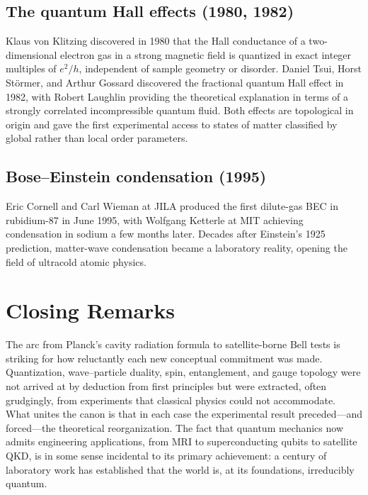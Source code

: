 \documentclass[11pt]{article}
\begin{document}
\subsection{The quantum Hall effects (1980, 1982)}
Klaus von Klitzing discovered in 1980 that the Hall conductance of a two-dimensional electron gas in a strong magnetic field is quantized in exact integer multiples of $e^2/h$, independent of sample geometry or disorder. Daniel Tsui, Horst St\"ormer, and Arthur Gossard discovered the fractional quantum Hall effect in 1982, with Robert Laughlin providing the theoretical explanation in terms of a strongly correlated incompressible quantum fluid. Both effects are topological in origin and gave the first experimental access to states of matter classified by global rather than local order parameters.

\subsection{Bose--Einstein condensation (1995)}
Eric Cornell and Carl Wieman at JILA produced the first dilute-gas BEC in rubidium-87 in June 1995, with Wolfgang Ketterle at MIT achieving condensation in sodium a few months later. Decades after Einstein's 1925 prediction, matter-wave condensation became a laboratory reality, opening the field of ultracold atomic physics.

\section{Closing Remarks}

The arc from Planck's cavity radiation formula to satellite-borne Bell tests is striking for how reluctantly each new conceptual commitment was made. Quantization, wave--particle duality, spin, entanglement, and gauge topology were not arrived at by deduction from first principles but were extracted, often grudgingly, from experiments that classical physics could not accommodate. What unites the canon is that in each case the experimental result preceded---and forced---the theoretical reorganization. The fact that quantum mechanics now admits engineering applications, from MRI to superconducting qubits to satellite QKD, is in some sense incidental to its primary achievement: a century of laboratory work has established that the world is, at its foundations, irreducibly quantum.
\end{document}
